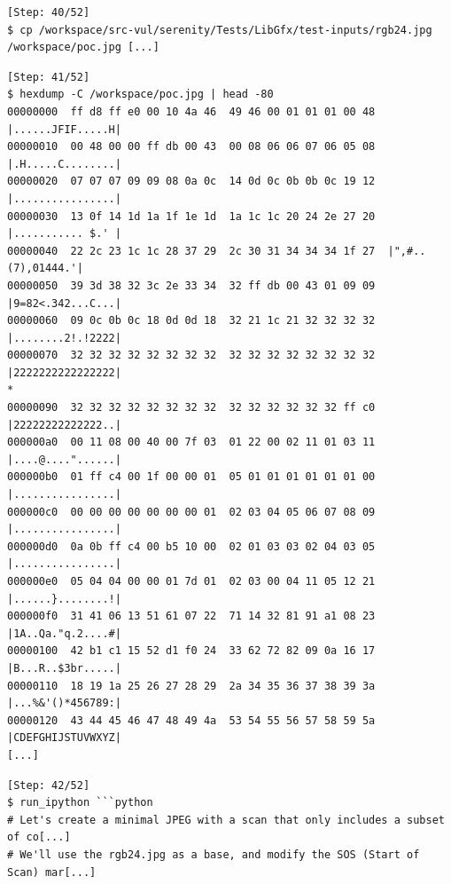 \begin{tcolorbox}[enhanced,title=Example of mutating PoCs with Python]
\begin{verbatim}
[Step: 40/52]
$ cp /workspace/src-vul/serenity/Tests/LibGfx/test-inputs/rgb24.jpg /workspace/poc.jpg [...]

\end{verbatim}
\begin{verbatim}
[Step: 41/52]
$ hexdump -C /workspace/poc.jpg | head -80
00000000  ff d8 ff e0 00 10 4a 46  49 46 00 01 01 01 00 48  |......JFIF.....H|
00000010  00 48 00 00 ff db 00 43  00 08 06 06 07 06 05 08  |.H.....C........|
00000020  07 07 07 09 09 08 0a 0c  14 0d 0c 0b 0b 0c 19 12  |................|
00000030  13 0f 14 1d 1a 1f 1e 1d  1a 1c 1c 20 24 2e 27 20  |........... $.' |
00000040  22 2c 23 1c 1c 28 37 29  2c 30 31 34 34 34 1f 27  |",#..(7),01444.'|
00000050  39 3d 38 32 3c 2e 33 34  32 ff db 00 43 01 09 09  |9=82<.342...C...|
00000060  09 0c 0b 0c 18 0d 0d 18  32 21 1c 21 32 32 32 32  |........2!.!2222|
00000070  32 32 32 32 32 32 32 32  32 32 32 32 32 32 32 32  |2222222222222222|
*
00000090  32 32 32 32 32 32 32 32  32 32 32 32 32 32 ff c0  |22222222222222..|
000000a0  00 11 08 00 40 00 7f 03  01 22 00 02 11 01 03 11  |....@...."......|
000000b0  01 ff c4 00 1f 00 00 01  05 01 01 01 01 01 01 00  |................|
000000c0  00 00 00 00 00 00 00 01  02 03 04 05 06 07 08 09  |................|
000000d0  0a 0b ff c4 00 b5 10 00  02 01 03 03 02 04 03 05  |................|
000000e0  05 04 04 00 00 01 7d 01  02 03 00 04 11 05 12 21  |......}........!|
000000f0  31 41 06 13 51 61 07 22  71 14 32 81 91 a1 08 23  |1A..Qa."q.2....#|
00000100  42 b1 c1 15 52 d1 f0 24  33 62 72 82 09 0a 16 17  |B...R..$3br.....|
00000110  18 19 1a 25 26 27 28 29  2a 34 35 36 37 38 39 3a  |...%&'()*456789:|
00000120  43 44 45 46 47 48 49 4a  53 54 55 56 57 58 59 5a  |CDEFGHIJSTUVWXYZ|
[...]
\end{verbatim}
\begin{verbatim}
[Step: 42/52]
$ run_ipython ```python
# Let's create a minimal JPEG with a scan that only includes a subset of co[...]
# We'll use the rgb24.jpg as a base, and modify the SOS (Start of Scan) mar[...]


\end{verbatim}
\end{tcolorbox}
